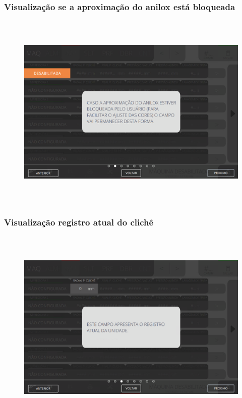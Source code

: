 \newpage
\thispagestyle{fancy}
\vspace*{\fill}
\subsubsection{\small{Visualização se a aproximação do anilox está bloqueada}}
\begin{figure}[h]
  \centering
  \includegraphics[width=576px,height=360px]{src/imagesFlexo/04-printter/01-printters/settings/e-2.png}
\end{figure}
\vspace*{\fill}

\newpage
\thispagestyle{fancy}
\vspace*{\fill}
\subsubsection{\small{Visualização registro atual do clichê}}
\begin{figure}[h]
  \centering
  \includegraphics[width=576px,height=360px]{src/imagesFlexo/04-printter/01-printters/settings/e-3.png}
\end{figure}
\vspace*{\fill}

